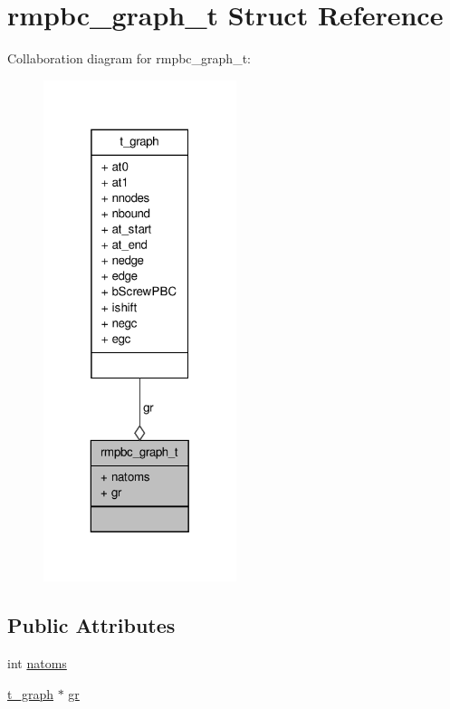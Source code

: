 \hypertarget{structrmpbc__graph__t}{\section{rmpbc\-\_\-graph\-\_\-t \-Struct \-Reference}
\label{structrmpbc__graph__t}
}


\-Collaboration diagram for rmpbc\-\_\-graph\-\_\-t\-:
\nopagebreak
\begin{figure}[H]
\begin{center}
\leavevmode
\includegraphics[width=160pt]{structrmpbc__graph__t__coll__graph}
\end{center}
\end{figure}
\subsection*{\-Public \-Attributes}
\begin{DoxyCompactItemize}
\item 
int \hyperlink{structrmpbc__graph__t_a4cc65ec71c4e56732cdeeac634ec92be}{natoms}
\item 
\hyperlink{structt__graph}{t\-\_\-graph} $\ast$ \hyperlink{structrmpbc__graph__t_a6205865b1c2ee341a9eba20d84b773e3}{gr}
\end{DoxyCompactItemize}



